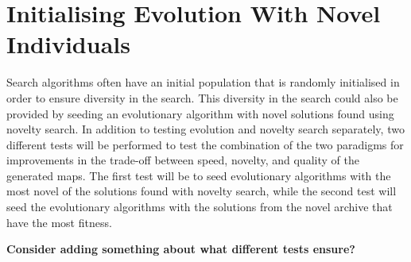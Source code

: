 \section{Initialising Evolution With Novel Individuals}
\label{methodology_evolutionnovelseeds}
Search algorithms often have an initial population that is randomly initialised in order to ensure diversity in the search. This diversity in the search could also be provided by seeding an evolutionary algorithm with novel solutions found using novelty search. In addition to testing evolution and novelty search separately, two different tests will be performed to test the combination of the two paradigms for improvements in the trade-off between speed, novelty, and quality of the generated maps. The first test will be to seed evolutionary algorithms with the most novel of the solutions found with novelty search, while the second test will seed the evolutionary algorithms with the solutions from the novel archive that have the most fitness.

\textbf{Consider adding something about what different tests ensure?}
